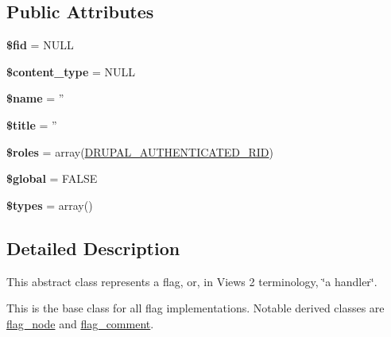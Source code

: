 \subsection*{Public Attributes}
\begin{CompactItemize}
\item 
\hypertarget{classflag__flag_e61023564c7cac497a8a4c782f4ea9e5}{
\textbf{\$fid} = NULL}
\label{classflag__flag_e61023564c7cac497a8a4c782f4ea9e5}

\item 
\hypertarget{classflag__flag_885b6be08e79d16d9d4825eba774e2cd}{
\textbf{\$content\_\-type} = NULL}
\label{classflag__flag_885b6be08e79d16d9d4825eba774e2cd}

\item 
\hypertarget{classflag__flag_79c974c0e24856ee3986fbb016b354c9}{
\textbf{\$name} = ''}
\label{classflag__flag_79c974c0e24856ee3986fbb016b354c9}

\item 
\hypertarget{classflag__flag_167b30e2fdfb0b3c65b231c081771c4c}{
\textbf{\$title} = ''}
\label{classflag__flag_167b30e2fdfb0b3c65b231c081771c4c}

\item 
\hypertarget{classflag__flag_52c0b2d19f33434d8eb2b84a538b1e7e}{
\textbf{\$roles} = array(\hyperlink{bootstrap_8inc_c2d2d9cd4c8559510f9baa997525373e}{DRUPAL\_\-AUTHENTICATED\_\-RID})}
\label{classflag__flag_52c0b2d19f33434d8eb2b84a538b1e7e}

\item 
\hypertarget{classflag__flag_13f786442d9ab8608f039b89c72d8639}{
\textbf{\$global} = FALSE}
\label{classflag__flag_13f786442d9ab8608f039b89c72d8639}

\item 
\hypertarget{classflag__flag_c0278701344a136ad8b3335420e23991}{
\textbf{\$types} = array()}
\label{classflag__flag_c0278701344a136ad8b3335420e23991}

\end{CompactItemize}


\subsection{Detailed Description}
This abstract class represents a flag, or, in Views 2 terminology, \char`\"{}a handler\char`\"{}.

This is the base class for all flag implementations. Notable derived classes are \hyperlink{classflag__node}{flag\_\-node} and \hyperlink{classflag__comment}{flag\_\-comment}. 

